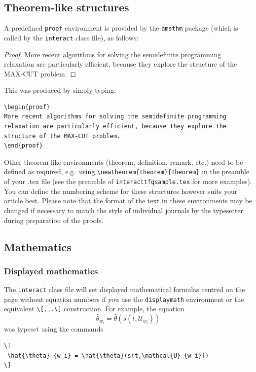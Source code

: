 \documentclass[]{interact}
\theoremstyle{plain}%
\theoremstyle{definition}
\theoremstyle{remark}
\begin{document}
\subsection{Theorem-like structures}

A predefined \verb"proof" environment is provided by the \texttt{amsthm} package (which is called by the \texttt{interact} class file), as follows:
\begin{proof}
More recent algorithms for solving the semidefinite programming relaxation are particularly efficient, because they explore the structure of the MAX-CUT problem.
\end{proof}
\noindent This was produced by simply typing:
\begin{verbatim}
\begin{proof}
More recent algorithms for solving the semidefinite programming
relaxation are particularly efficient, because they explore the
structure of the MAX-CUT problem.
\end{proof}
\end{verbatim}
Other theorem-like environments (theorem, definition, remark, etc.) need to be defined as required, e.g.\ using \verb"\newtheorem{theorem}{Theorem}" in the preamble of your .tex file (see the preamble of \verb"interacttfqsample.tex" for more examples). You can define the numbering scheme for these structures however suits your article best. Please note that the format of the text in these environments may be changed if necessary to match the style of individual journals by the typesetter during preparation of the proofs.


\subsection{Mathematics}

\subsubsection{Displayed mathematics}

The \texttt{interact} class file will set displayed mathematical formulas centred on the page without equation numbers if you use the \texttt{displaymath} environment or the equivalent \verb"\[...\]" construction. For example, the equation
\[
 \hat{\theta}_{w_i} = \hat{\theta}(s(t,\mathcal{U}_{w_i}))
\]
was typeset using the commands
\begin{verbatim}
\[
 \hat{\theta}_{w_i} = \hat{\theta}(s(t,\mathcal{U}_{w_i}))
\]
\end{verbatim}
\end{document}
